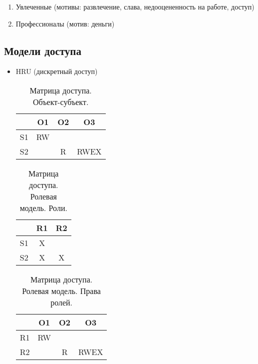 \begin{enumerate}
    \item Увлеченные (мотивы: развлечение, слава, недооцененность на работе, доступ)
    \item Профессионалы (мотив: деньги)
\end{enumerate}

\subsection{Модели доступа}

\begin{itemize}
    \item HRU (дискретный доступ)
        \begin{table}[H]
            \centering
            \caption{Матрица доступа. Объект-субъект.}
            \label{tab:label}
            \begin{tabular}{|c|c|c|c|}
                \hline
                   & O1 & O2 & O3 \\
                \hline
                S1 & RW & & \\
                \hline
                S2 & & R & RWEX \\
                \hline
            \end{tabular}
        \end{table}

        \begin{table}[H]
            \centering
            \caption{Матрица доступа. Ролевая модель. Роли.}
            \label{tab:label}
            \begin{tabular}{|c|c|c|}
                \hline
                   & R1 & R2 \\
                \hline
                S1 & X & \\
                \hline
                S2 & X & X \\
                \hline
            \end{tabular}
        \end{table}

        \begin{table}[H]
            \centering
            \caption{Матрица доступа. Ролевая модель. Права ролей.}
            \label{tab:label}
            \begin{tabular}{|c|c|c|c|}
                \hline
                   & O1 & O2 & O3 \\
                \hline
                R1 & RW & & \\
                \hline
                R2 & & R & RWEX \\
                \hline
            \end{tabular}
        \end{table}


\end{itemize}
